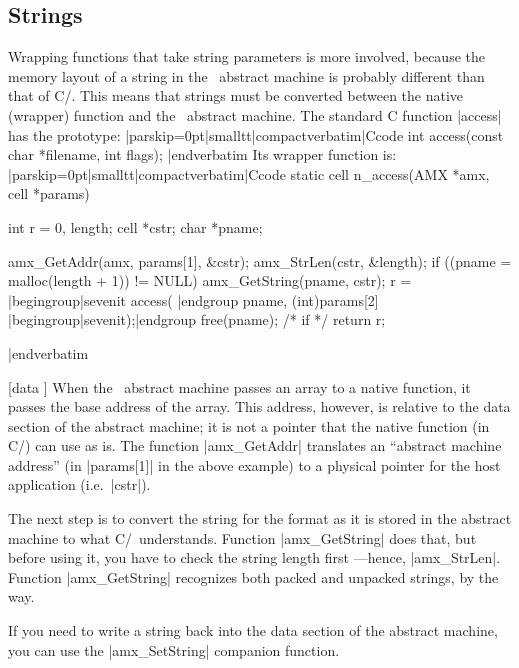 \subsection{Strings}
 
Wrapping functions that take string parameters is more involved, because the
memory layout of a string in the \Small\ abstract machine is probably different
than that of C/\Cpp. This means that
strings must be converted between the native (wrapper) function and the \Small\ abstract
machine. The standard C function |access| has the prototype:
\goodbreak
\listingx\verbatim|parskip=0pt|smalltt|compactverbatim|Ccode
int access(const char *filename, int flags);
|endverbatim\endlistingx
\goodbreak
Its wrapper function is:
\listingx\verbatim|parskip=0pt|smalltt|compactverbatim|Ccode
static cell n_access(AMX *amx, cell *params)
{
  int r = 0, length;
  cell *cstr;
  char *pname;

  amx_GetAddr(amx, params[1], &cstr);
  amx_StrLen(cstr, &length);
  if ((pname = malloc(length + 1)) != NULL) {
    amx_GetString(pname, cstr);
    r = |begingroup|sevenit access( |endgroup pname, (int)params[2] |begingroup|sevenit);|endgroup
    free(pname);
  } /* if */
  return r;
}
|endverbatim\endlistingx

 [data \midtilde]
When the \Small\ abstract machine passes an array to a native function, it passes
the base address of the array. This address, however, is relative to the data section
of the abstract machine; it is not a pointer that the native function (in C/\Cpp)
can use as is. The function |amx_GetAddr| translates an ``abstract machine address''
(in |params[1]| in the above example) to a physical pointer for the host application
(i.e.\ |cstr|).

The next step is to convert the string for the format as it is stored in the abstract
machine to what C/\Cpp\ understands. Function |amx_GetString| does that, but before
using it, you have to check the string length first ---hence, |amx_StrLen|.
Function |amx_GetString| recognizes both packed and unpacked strings, by the way.

If you need to write a string back into the data section of the abstract machine,
you can use the |amx_SetString| companion function.

